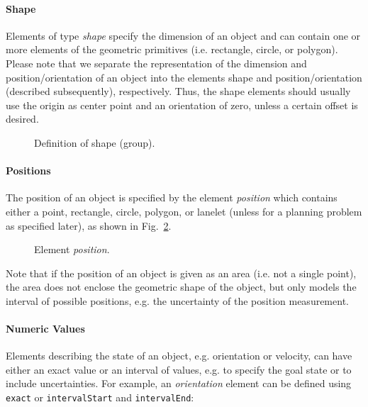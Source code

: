 \paragraph{Shape}
Elements of type \emph{shape} specify the dimension of an object and can contain one or more elements of the geometric primitives (i.e. rectangle, circle, or polygon). Please note that we separate the representation of the dimension and position/orientation of an object into the elements shape and position/orientation (described subsequently), respectively. Thus, the shape elements should usually use the origin as center point and an orientation of zero, unless a certain offset is desired.

\begin{figure}[!htpb]
	\small
	\caption{Definition of shape (group).}
	\label{fig:auxiliary}
\end{figure}

\paragraph{Positions}
The position of an object is specified by the element \emph{position} which contains either a point, rectangle, circle, polygon, or lanelet (unless for a planning problem as specified later), as shown in Fig.~\ref{fig:position}.

\begin{figure}[!htpb]
	\small
	\caption{Element \textit{position}.}
	\label{fig:position}
\end{figure}

Note that if the position of an object is given as an area (i.e. not a single point), the area does not enclose the geometric shape of the object, but only models the interval of possible positions, e.g. the uncertainty of the position measurement.


\paragraph{Numeric Values}
Elements describing the state of an object, e.g. orientation or velocity, can have either an exact value or an interval of values, e.g. to specify the goal state or to include uncertainties.
For example, an \textit{orientation} element can be defined using \texttt{exact} or \texttt{intervalStart} and \texttt{intervalEnd}:

